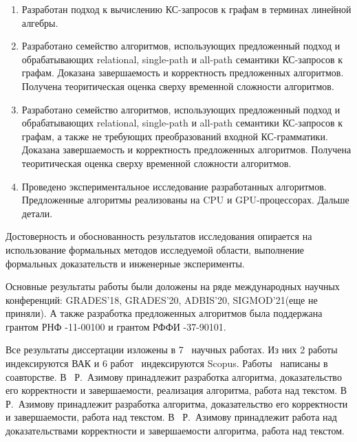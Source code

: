 {}
\begin{enumerate}[beginpenalty=10000] %
	\item Разработан подход к вычислению КС-запросов к графам в терминах линейной алгебры.
	\item Разработано семейство алгоритмов, использующих предложенный подход и обрабатывающих relational, single-path и all-path семантики КС-запросов к графам. Доказана завершаемость и корректность предложенных алгоритмов. Получена теоритическая оценка сверху временной сложности алгоритмов.
	\item Разработано семейство алгоритмов, использующих предложенный подход и обрабатывающих relational, single-path и all-path семантики КС-запросов к графам, а также не требующих преобразований входной КС-грамматики. Доказана завершаемость и корректность предложенных алгоритмов. Получена теоритическая оценка сверху временной сложности алгоритмов.
	\item Проведено экспериментальное исследование разработанных алгоритмов. Предложенные алгоритмы реализованы на CPU и GPU-процессорах. Дальше детали.
\end{enumerate}

{\reliability} 
Достоверность и обоснованность результатов исследования опирается на использование формальных методов исследуемой области, выполнение формальных доказательств и инженерные эксперименты.

Основные результаты работы были доложены на ряде международных научных конференций: GRADES'18, GRADES'20, ADBIS’20, SIGMOD'21(еще не приняли). А также разработка предложенных алгоритмов была поддержана грантом РНФ -11-00100 и грантом РФФИ -37-90101.


{\publications} Все результаты диссертации изложены в 7~\cite{1,2,3,4,5,6,7} научных работах. Из них 2 работы~\cite{6,7} индексируются ВАК и 6 работ~\cite{1,2,3,4,5,6} индексируются Scopus. Работы~\cite{1,2,3,4,6,7} написаны в соавторстве. В~\cite{1,6,7} Р.~Азимову принадлежит разработка алгоритма, доказательство его корректности и завершаемости, реализация алгоритма, работа над текстом. В~\cite{2} Р.~Азимову принадлежит разработка алгоритма, доказательство его корректности и завершаемости, работа над текстом. В~\cite{3,4} Р.~Азимову принадлежит работа над доказательствами корректности и завершаемости алгоритма, работа над текстом.

